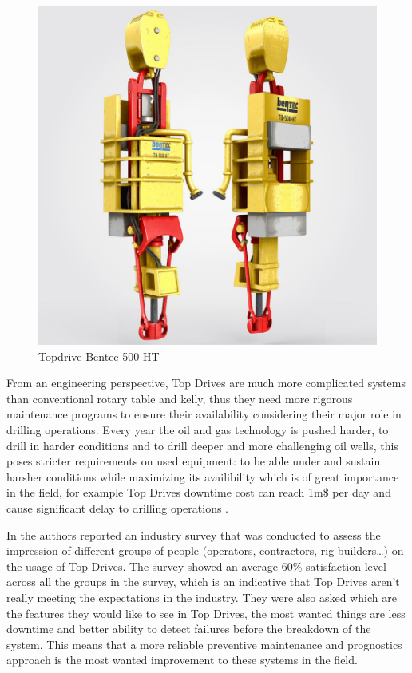 \begin{figure}[h]
	\centering
	\includegraphics[width=0.9\linewidth]{figures/bentec_500_ht.jpg}
	\caption{Topdrive Bentec 500-HT}%
	\label{fig:figures/bentec_500_ht}
\end{figure}

From an engineering perspective, Top Drives are much more complicated systems than conventional rotary table and kelly, thus they need more rigorous maintenance programs to ensure their availability considering their major role in drilling operations. Every year the oil and gas technology is pushed harder, to drill in harder conditions and to drill deeper and more challenging oil wells, this poses stricter requirements on used equipment: to be able under and sustain harsher conditions while maximizing its availibility which is of great importance in the field, for example  Top Drives downtime cost can reach 1m\$ per day and cause significant delay to drilling operations \cite{skfbrochure}. 

In \cite{Pournazari2016} the authors reported an industry survey that was conducted to assess the impression of different groups of people (operators, contractors, rig builders…) on the usage of Top Drives. The survey showed an average 60\% satisfaction level across all the groups in the survey, which is an indicative that Top Drives aren't really meeting the expectations in the industry. They were also asked which are the features they would like to see in Top Drives, the most wanted things are less downtime and better ability to detect failures before the breakdown of the system. This means that a more reliable preventive maintenance and prognostics approach is the most wanted improvement to these systems in the field.

